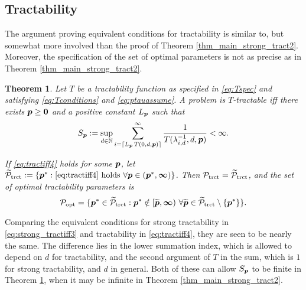 \documentclass[sort&compress]{elsarticle}
\newtheorem{theorem}{Theorem}
\begin{document}
\subsection{Tractability} \label{sec:tractability}


The argument proving equivalent conditions for tractability is similar to, but somewhat more involved than the proof of Theorem \ref{thm_main_strong_tract2}.  Moreover, the specification of the set of optimal parameters is not as precise as in Theorem \ref{thm_main_strong_tract2}.

\begin{theorem}\label{thm_main_tract2}
Let $T$ be a tractability function as specified in \eqref{eq:Tspec} and satisfying \eqref{eq:Tconditions} and \eqref{eq:ptauassume}.  A problem is $T$-tractable iff there exists $\boldsymbol{p}\ge \boldsymbol{0}$ and a positive constant $L_{\boldsymbol{p}}$ such that
\begin{equation} \label{eq:tractiff4}
     S_{\boldsymbol{p}}:=\sup_{d \in \mathbb{N}}
     \sum_{i = \lceil L_{\boldsymbol{p}}\, T(0,d,\boldsymbol{p}) \rceil}^\infty \frac{1}{T(\lambda^{-1}_{i,d},d,\boldsymbol{p})}< \infty.
\end{equation}

If \eqref{eq:tractiff4} holds for some $\boldsymbol{p}$, let $\widetilde{\mathcal{P}}_{\textup{trct}} : = \{\boldsymbol{p}^* : \eqref{eq:tractiff4} \text{ holds }\forall \boldsymbol{p} \in (\boldsymbol{p}^*,\boldsymbol{\infty}) \}$.
Then $\mathcal{P}_{\textup{trct}} = \widetilde{\mathcal{P}}_{\textup{trct}}$, and the set of optimal  tractability parameters is
\[
\mathcal{P}_{\textup{opt}} =
\{\boldsymbol{p}^* \in \widetilde{\mathcal{P}}_{\textup{trct}} :  \boldsymbol{p}^* \notin [\widetilde{\boldsymbol{p}},\boldsymbol{\infty}) \ \forall \widetilde{\boldsymbol{p}}\in  \widetilde{\mathcal{P}}_{\textup{trct}} \setminus \{\boldsymbol{p}^*\} \}.
\]

\end{theorem}

Comparing the equivalent conditions for strong tractability in \eqref{eq:strong_tractiff3} and tractability in \eqref{eq:tractiff4}, they are seen to be nearly the same.  The difference lies in the lower summation index, which is allowed to depend on $d$ for tractability, and the second argument of $T$ in the sum, which is $1$ for strong tractability, and $d$ in general.  Both of these can allow $S_{\boldsymbol{p}}$ to be finite in Theorem \ref{thm_main_tract2}, when it may be infinite in Theorem \ref{thm_main_strong_tract2}.
\end{document}
